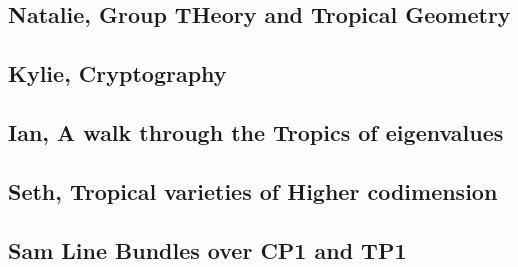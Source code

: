 \documentclass[11pt]{article}
\theoremstyle{definition}
\begin{document}
\subsection{Natalie, Group THeory and Tropical Geometry}



\subsection{Kylie, Cryptography}


\subsection{Ian, A walk through the Tropics of eigenvalues}



\subsection{Seth, Tropical varieties of Higher codimension}



\subsection{Sam Line Bundles over CP1 and TP1}






\end{document}
